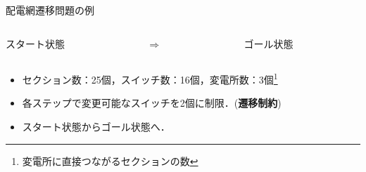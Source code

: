 \documentclass[dvipdfmx,11pt]{beamer}
\begin{document}
\begin{frame}{配電網遷移問題の例}
  \renewcommand{\thefootnote}{\fnsymbol{footnote}}
  \setcounter{footnote}{1}
  \begin{columns}
    \begin{column}{0.45\textwidth}\centering
      \begin{exampleblock}{スタート状態}
    \centering
    \scalebox{0.35}{}
      \end{exampleblock}
    \end{column}
    \begin{column}{0.05\textwidth}\centering
      $\Rightarrow$
    \end{column}
    \begin{column}{0.45\textwidth}\centering
      \begin{exampleblock}{ゴール状態}
        \centering
        \scalebox{0.35}{}
      \end{exampleblock}
    \end{column}
  \end{columns}
 \vfill
 \begin{itemize}
  \item セクション数：25個，スイッチ数：16個，変電所数：3個\footnote{%
        変電所に直接つながるセクションの数}%
  \item 各ステップで変更可能なスイッチを2個に制限．(\textbf{遷移制約})
  \item スタート状態からゴール状態へ．
 \end{itemize}
\end{frame}
\end{document}
